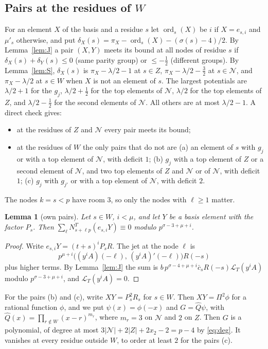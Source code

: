 \documentclass[11pt]{amsart}
\newtheorem{lemma}[theorem]{Lemma}
\theoremstyle{definition}
\theoremstyle{remark}
\numberwithin{equation}{section}
\newcommand{\cL}{\mathcal L}
\begin{document}
\subsection{Pairs at the residues of \texorpdfstring{$W$}{W}}
For an element $X$ of the basis and a residue $s$ let $\operatorname{ord}_s(X)$ be $i$ if $X=e_{s,i}$ and $\mu'_s$
otherwise, and put $\delta_X(s)=\pi_X-\operatorname{ord}_s(X)-(\sigma(s)-4)/2$. By Lemma~\ref{lem:J} a pair $(X,Y)$ meets
its bound at all nodes of residue $s$ if $\delta_X(s)+\delta_Y(s)\le0$ (same parity group) or $\le-\frac12$ (different
groups). By Lemma~\ref{lem:S}, $\delta_X(s)$ is $\pi_X-\lambda/2-1$ at $s\in Z$, $\pi_X-\lambda/2-\frac32$ at
$s\in\mathcal N$, and $\pi_X-\lambda/2$ at $s\in W$ when $X$ is not an element of $s$. The largest potentials are
$\lambda/2+1$ for the $g_j$, $\lambda/2+\frac12$ for the top elements of $\mathcal N$, $\lambda/2$ for the top elements of
$Z$, and $\lambda/2-\frac12$ for the second elements of $\mathcal N$. All others are at most $\lambda/2-1$. A direct
check gives:
\begin{itemize}
\item at the residues of $Z$ and $\mathcal N$ every pair meets its bound;
\item at the residues of $W$ the only pairs that do not are (a) an element of $s$ with $g_j$ or with a top element of
 $\mathcal N$, with deficit $1$; (b) $g_j$ with a top element of $Z$ or a second element of $\mathcal N$, and two top
 elements of $Z$ and $\mathcal N$ or of $\mathcal N$, with deficit $1$; (c) $g_j$ with $g_{j'}$ or with a top element of
 $\mathcal N$, with deficit $2$.
\end{itemize}
The nodes $k=s<p$ have room $3$, so only the nodes with $\ell\ge1$ matter.

\begin{lemma}[own pairs]\label{lem:own}
Let $s\in W$, $i<\mu$, and let $Y$ be a basis element with the factor $P_s$. Then
$\sum_{\ell}N^T_{s+\ell p}(e_{s,i}Y)\equiv0$ modulo $p^{\sigma-3+\mu+i}$.
\end{lemma}

\begin{proof}
Write $e_{s,i}Y=(t+s)^iP_sR$. The jet at the node $\ell$ is
\[
 p^{\mu+i}\bigl((y^iA)(-\ell),\,(y^iA)'(-\ell)\bigr)R(-s)
\]
plus higher terms. By Lemma~\ref{lem:J} the sum is $b\,p^{\sigma-4+\mu+i}\bar c_sR(-s)\cL_T(y^iA)$ modulo
$p^{\sigma-3+\mu+i}$, and $\cL_T(y^iA)=0$.
\end{proof}

For the pairs (b) and (c), write $XY=P_s^2R_s$ for $s\in W$. Then $XY=\Pi^2\phi$ for a rational function $\phi$, and we
put $\psi(x)=\phi(-x)$ and $G=\hat Q\psi$, with $\hat Q(x)=\prod_{r\notin W}(x-r)^{m_r}$, where $m_r=3$ on $\mathcal N$ and
$2$ on $Z$. Then $G$ is a polynomial, of degree at most $3|\mathcal N|+2|Z|+2x_2-2=p-4$ by \eqref{eq:deg}. It vanishes
at every residue outside $W$, to order at least $2$ for the pairs (c).
\end{document}
